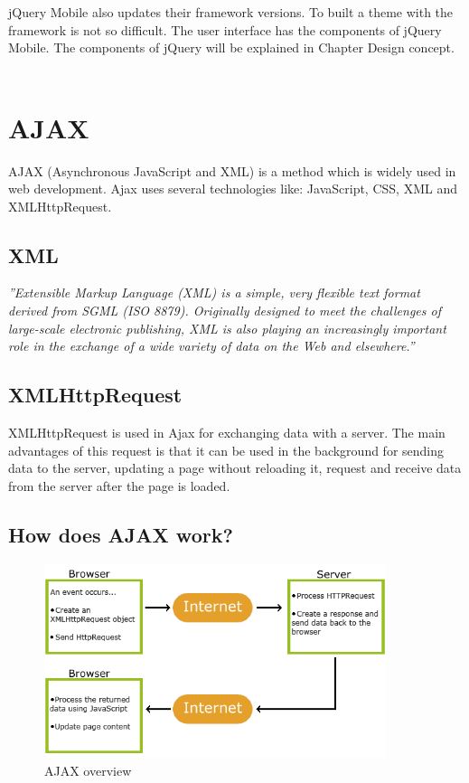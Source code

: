   jQuery Mobile  also updates their framework versions. To built a theme with the framework is not so difficult. The user interface has the components of jQuery Mobile. The components of jQuery will be explained in Chapter Design concept.\\\\
  \newpage
  \section {AJAX}
  AJAX (Asynchronous JavaScript and XML) is a method which is widely used in web development. Ajax uses several technologies like: JavaScript, CSS, XML and XMLHttpRequest.\cite{ajax}
  \\
  \subsection{XML}
  \textit{''Extensible Markup Language (XML) is a simple, very flexible text format derived from SGML (ISO 8879). Originally designed to meet the challenges of large-scale electronic publishing, XML is also playing an increasingly important role in the exchange of a wide variety of data on the Web and elsewhere.''}\cite{xml}
  \\
  \subsection{XMLHttpRequest}
  XMLHttpRequest is used in Ajax for exchanging data with a server. The main advantages of this request is that it can be used in the background for sending data to the server, updating a page without reloading it, request and receive data from the server after the page is loaded.\cite{xmlHttp} 
 
  \subsection{How does AJAX work?}
  \begin{figure}[htbp]
  \centering
  \includegraphics[width=100mm,height=\textheight,keepaspectratio]{graphics/ajaxwork.png}
  \caption{AJAX overview\cite{ajax}}
  \end{figure}
  
